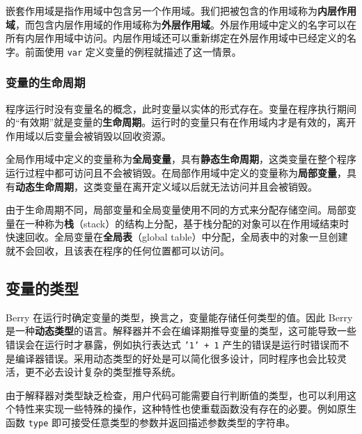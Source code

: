 嵌套作用域是指作用域中包含另一个作用域。我们把被包含的作用域称为\textbf{内层作用域}，而包含内层作用域的作用域称为\textbf{外层作用域}。外层作用域中定义的名字可以在所有内层作用域中访问。内层作用域还可以重新绑定在外层作用域中已经定义的名字。前面使用 \texttt{var} 定义变量的例程就描述了这一情景。

\subsubsection{变量的生命周期}

程序运行时没有变量名的概念，此时变量以实体的形式存在。变量在程序执行期间的“有效期”就是变量的\textbf{生命周期}。运行时的变量只有在作用域内才是有效的，离开作用域以后变量会被销毁以回收资源。

全局作用域中定义的变量称为\textbf{全局变量}，具有\textbf{静态生命周期}，这类变量在整个程序运行过程中都可访问且不会被销毁。在局部作用域中定义的变量称为\textbf{局部变量}，具有\textbf{动态生命周期}，这类变量在离开定义域以后就无法访问并且会被销毁。

由于生命周期不同，局部变量和全局变量使用不同的方式来分配存储空间。局部变量在一种称为\textbf{栈}（stack）的结构上分配，基于栈分配的对象可以在作用域结束时快速回收。全局变量在\textbf{全局表}（global table）中分配，全局表中的对象一旦创建就不会回收，且该表在程序的任何位置都可以访问。

\subsection{变量的类型}

Berry 在运行时确定变量的类型，换言之，变量能存储任何类型的值。因此 Berry 是一种\textbf{动态类型}的语言。解释器并不会在编译期推导变量的类型，这可能导致一些错误会在运行时才暴露，例如执行表达式 \texttt{'1' + 1} 产生的错误是运行时错误而不是编译器错误。采用动态类型的好处是可以简化很多设计，同时程序也会比较灵活，更不必去设计复杂的类型推导系统。

由于解释器对类型缺乏检查，用户代码可能需要自行判断值的类型，也可以利用这个特性来实现一些特殊的操作，这种特性也使重载函数没有存在的必要。例如原生函数 \texttt{type} 即可接受任意类型的参数并返回描述参数类型的字符串。
